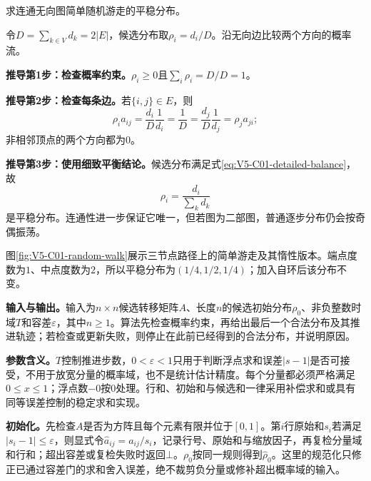 
\begin{derivationgoalbox}
求连通无向图简单随机游走的平稳分布。
\end{derivationgoalbox}
\begin{derivationprepbox}
令$D=\sum_{k\in V}d_k=2|E|$，候选分布取$\rho_i=d_i/D$。沿无向边比较两个方向的概率流。
\end{derivationprepbox}
\textbf{推导第1步：检查概率约束。}$\rho_i\ge0$且$\sum_i\rho_i=D/D=1$。

\textbf{推导第2步：检查每条边。}若$\{i,j\}\in E$，则
\[
\rho_i a_{ij}=\frac{d_i}{D}\frac1{d_i}=\frac1D
=\frac{d_j}{D}\frac1{d_j}=\rho_j a_{ji};
\]
非相邻顶点的两个方向都为$0$。

\textbf{推导第3步：使用细致平衡结论。}候选分布满足式\eqref{eq:V5-C01-detailed-balance}，故
\begin{equation}\label{eq:V5-C01-degree-stationary}
\rho_i=\frac{d_i}{\sum_kd_k}
\end{equation}
是平稳分布。连通性进一步保证它唯一，但若图为二部图，普通逐步分布仍会按奇偶振荡。

图\ref{fig:V5-C01-random-walk}展示三节点路径上的简单游走及其惰性版本。端点度数为$1$、中点度数为$2$，所以平稳分布为$(1/4,\allowbreak 1/2,\allowbreak 1/4)$；加入自环后该分布不变。


\label{struct:V5-C01-CH19}
\label{struct:V5-C01-CH20}
\textbf{输入与输出。}输入为$n\times n$候选转移矩阵$A$、长度$n$的候选初始分布$\rho_0$、非负整数时域$T$和容差$\varepsilon$，其中$n\ge1$。算法先检查概率约束，再给出最后一个合法分布及其推进轨迹；若检查或更新失败，则停止在此前已经得到的合法分布，并说明原因。

\label{struct:V5-C01-CH21}
\textbf{参数含义。}$T$控制推进步数，$0<\varepsilon<1$只用于判断浮点求和误差$|s-1|$是否可接受，不用于放宽分量的概率域，也不是统计估计精度。每个分量都必须严格满足$0\le x\le1$；浮点数$-0$按$0$处理。行和、初始和与候选和一律采用补偿求和或具有同等误差控制的稳定求和实现。

\label{struct:V5-C01-CH22}
\textbf{初始化。}先检查$A$是否为方阵且每个元素有限并位于$[0,1]$。第$i$行原始和$s_i$若满足$|s_i-1|\le\varepsilon$，则显式令$\widehat a_{ij}=a_{ij}/s_i$，记录行号、原始和与缩放因子，再复检分量域和行和；超出容差或复检失败时返回$\bot$。$\rho_0$按同一规则得到$\widehat\rho_0$。这里的规范化只修正已通过容差门的求和舍入误差，绝不裁剪负分量或修补超出概率域的输入。

